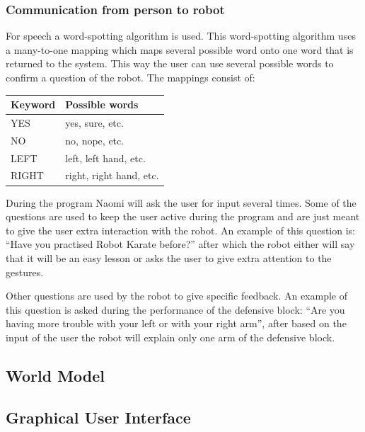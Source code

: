 \documentclass[10pt,a4paper,oneside]{scrartcl}
\begin{document}
\subsubsection{Communication from person to robot}
For speech a word-spotting algorithm is used.
This word-spotting algorithm uses a many-to-one mapping which maps several possible word onto one word that is returned to the system. 
This way the user can use several possible words to confirm a question of the robot. 
The mappings consist of: 
\begin{table}
  \begin{tabular}{|l|l|} \hline
    Keyword & Possible words           \\
    \hline 
    YES     & yes, sure, etc.          \\
    NO      & no, nope, etc.           \\
    LEFT    & left, left hand, etc.    \\
    RIGHT   & right, right hand, etc.  \\
    \hline
  \end{tabular}
\end{table}

During the program Naomi will ask the user for input several times. 
Some of the questions are used to keep the user active during the program and are just meant to give the user extra interaction with the robot. 
An example of this question is: ``Have you practised Robot Karate before?'' after which the robot either will say that it will be an easy lesson or asks the user to give extra attention to the gestures. 

Other questions are used by the robot to give specific feedback.
An example of this question is asked during the performance of the defensive block: ``Are you having more trouble with your left or with your right arm'', after based on the input of the user the robot will explain only one arm of the defensive block. 



\subsection{World Model}

\subsection{Graphical User Interface}
\end{document}
